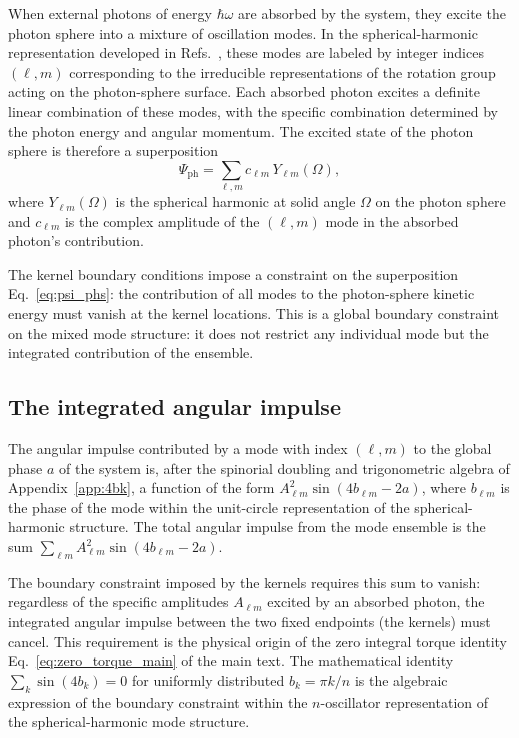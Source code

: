 \documentclass[%
 reprint, amsmath,amssymb, aps, prb, ]{revtex4-2}
\numberwithin{equation}{section}
\begin{document}
When external photons of energy $\hbar\omega$ are absorbed by the system, they excite the photon sphere into a mixture of oscillation modes. In the spherical-harmonic representation developed in Refs.~\cite{hanamura50, hanamura48}, these modes are labeled by integer indices $(\ell, m)$ corresponding to the irreducible representations of the rotation group acting on the photon-sphere surface. Each absorbed photon excites a definite linear combination of these modes, with the specific combination determined by the photon energy and angular momentum. The excited state of the photon sphere is therefore a superposition
\begin{equation}
\Psi_{\mathrm{ph}} = \sum_{\ell, m} c_{\ell m} \, Y_{\ell m}(\Omega),
\label{eq:psi_phs}
\end{equation}
where $Y_{\ell m}(\Omega)$ is the spherical harmonic at solid angle $\Omega$ on the photon sphere and $c_{\ell m}$ is the complex amplitude of the $(\ell, m)$ mode in the absorbed photon's contribution.

The kernel boundary conditions impose a constraint on the superposition Eq.~\eqref{eq:psi_phs}: the contribution of all modes to the photon-sphere kinetic energy must vanish at the kernel locations. This is a global boundary constraint on the mixed mode structure: it does not restrict any individual mode but the integrated contribution of the ensemble.

\subsection{The integrated angular impulse}
\label{sec:integrated_angular_impulse}

The angular impulse contributed by a mode with index $(\ell, m)$ to the global phase $a$ of the system is, after the spinorial doubling and trigonometric algebra of Appendix~\ref{app:4bk}, a function of the form $A_{\ell m}^2 \sin(4 b_{\ell m} - 2a)$, where $b_{\ell m}$ is the phase of the mode within the unit-circle representation of the spherical-harmonic structure. The total angular impulse from the mode ensemble is the sum $\sum_{\ell m} A_{\ell m}^2 \sin(4 b_{\ell m} - 2a)$.

The boundary constraint imposed by the kernels requires this sum to vanish: regardless of the specific amplitudes $A_{\ell m}$ excited by an absorbed photon, the integrated angular impulse between the two fixed endpoints (the kernels) must cancel. This requirement is the physical origin of the zero integral torque identity Eq.~\eqref{eq:zero_torque_main} of the main text. The mathematical identity $\sum_k \sin(4 b_k) = 0$ for uniformly distributed $b_k = \pi k/n$ is the algebraic expression of the boundary constraint within the $n$-oscillator representation of the spherical-harmonic mode structure.
\end{document}
